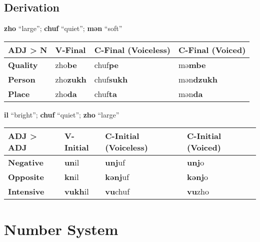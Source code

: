 \documentclass[oneside]{book}
\begin{document}
\subsection{Derivation}

\textbf{zho} ``large'';
\textbf{chuf} ``quiet'';
\textbf{mǝn} ``soft''

\begin{center}
\begin{tabular}{|l|l|l|l|}\hline
\textbf{ADJ > N}&\textbf{V-Final}&\textbf{C-Final (Voiceless)}&\textbf{C-Final (Voiced)}\\\hline
\textbf{Quality}&zho\textbf{be}&chuf\textbf{pe}&mǝ\textbf{mbe}\\\hline
\textbf{Person}&zho\textbf{zukh}&chuf\textbf{sukh}&mǝn\textbf{dzukh}\\\hline
\textbf{Place}&zho\textbf{da}&chuf\textbf{ta}&mǝn\textbf{da}\\\hline
\end{tabular}
\end{center}

\textbf{il} ``bright'';
\textbf{chuf} ``quiet'';
\textbf{zho} ``large''

\begin{center}
\begin{tabular}{|l|l|l|l|}\hline
\textbf{ADJ > ADJ}&\textbf{V-Initial}&\textbf{C-Initial (Voiceless)}&\textbf{C-Initial (Voiced)}\\\hline
\textbf{Negative}&\textbf{un}il&\textbf{unj}uf&\textbf{unj}o\\\hline
\textbf{Opposite}&\textbf{kn}il&\textbf{kǝnj}uf&\textbf{kǝnj}o\\\hline
\textbf{Intensive}&\textbf{vukh}il&\textbf{vu}chuf&\textbf{vu}zho\\\hline
\end{tabular}
\end{center}

\section{Number System}
\end{document}
